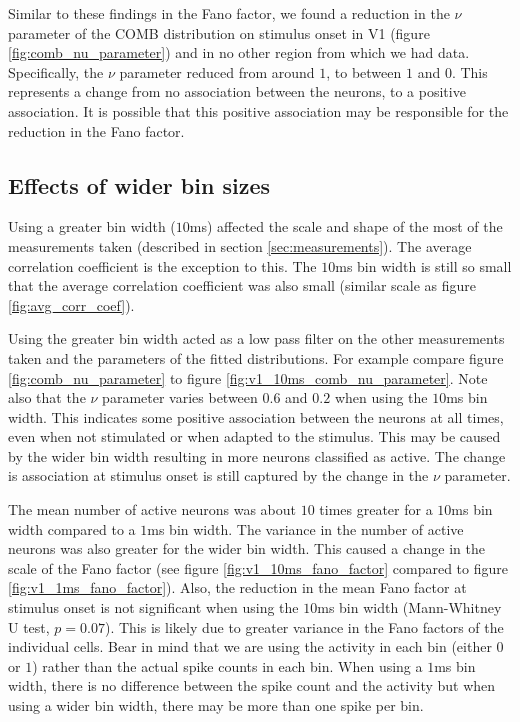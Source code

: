   Similar to these findings in the Fano factor, we found a reduction in the $\nu$ parameter of the COMB distribution on stimulus onset in V1 (figure \ref{fig:comb_nu_parameter}) and in no other region from which we had data. Specifically, the $\nu$ parameter reduced from around $1$, to between $1$ and $0$. This represents a change from no association between the neurons, to a positive association. It is possible that this positive association may be responsible for the reduction in the Fano factor.

  \subsection{Effects of wider bin sizes}
  Using a greater bin width ($10$ms) affected the scale and shape of the most of the measurements taken (described in section \ref{sec:measurements}). The average correlation coefficient is the exception to this. The $10$ms bin width is still so small that the average correlation coefficient was also small (similar scale as figure \ref{fig:avg_corr_coef}).

  Using the greater bin width acted as a low pass filter on the other measurements taken and the parameters of the fitted distributions. For example compare figure \ref{fig:comb_nu_parameter} to figure \ref{fig:v1_10ms_comb_nu_parameter}. Note also that the $\nu$ parameter varies between $0.6$ and $0.2$ when using the $10$ms bin width. This indicates some positive association between the neurons at all times, even when not stimulated or when adapted to the stimulus. This may be caused by the wider bin width resulting in more neurons classified as active. The change is association at stimulus onset is still captured by the change in the $\nu$ parameter.

  The mean number of active neurons was about $10$ times greater for a $10$ms bin width compared to a $1$ms bin width. The variance in the number of active neurons was also greater for the wider bin width. This caused a change in the scale of the Fano factor (see figure \ref{fig:v1_10ms_fano_factor} compared to figure  \ref{fig:v1_1ms_fano_factor}). Also, the reduction in the mean Fano factor at stimulus onset is not significant when using the $10$ms bin width (Mann-Whitney U test, $p = 0.07$). This is likely due to greater variance in the Fano factors of the individual cells. Bear in mind that we are using the activity in each bin (either $0$ or $1$) rather than the actual spike counts in each bin. When using a $1$ms bin width, there is no difference between the spike count and the activity but when using a wider bin width, there may be more than one spike per bin.

